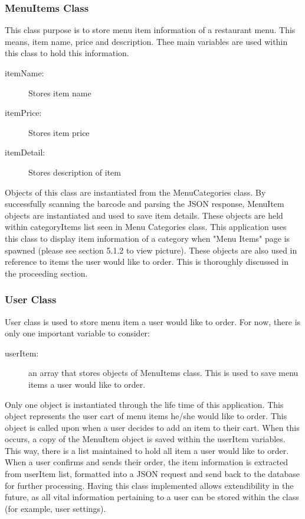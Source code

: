 \documentclass[12pt, titlepage]{article}
\begin{document}
\subsubsection{MenuItems Class}
This class purpose is to store menu item information of a restaurant menu. This means, item name, price and description. Thee main variables are used within this class to hold this information.

\begin{description}
  \item[itemName:] Stores item name
  \item[itemPrice:] Stores item price
  \item[itemDetail:] Stores description of item
\end{description}

Objects of this class are instantiated from the MenuCategories class. By successfully scanning the barcode and parsing the JSON response, MenuItem objects are instantiated and used to save item details. These objects are held within categoryItems list seen in Menu Categories class. This application uses this class to display item information of a category when "Menu Items" page is spawned (please see section 5.1.2 to view picture). These objects are also used in reference to items the user would like to order. This is thoroughly discussed in the proceeding section.  

\subsubsection{User Class}
User class is used to store menu item a user would like to order. For now, there is only one important variable to consider: 

 \begin{description}
  \item[userItem:] an array that stores objects of MenuItems class. This is used to save menu items a user would like to order.
\end{description}

Only one object is instantiated through the life time of this application. This object represents the user cart of menu items he/she would like to order. This object is called upon when a user decides to add an item to their cart. When this occurs, a copy of the MenuItem object is saved within the userItem variables. This way, there is a list maintained to hold all item a user would like to order. When a user confirms and sends their order, the item information is extracted from userItem list, formatted into a JSON request and send back to the database for further processing. Having this class implemented allows extendibility in the future, as all vital information pertaining to a user can be stored within the class (for example, user settings). 
\end{document}
